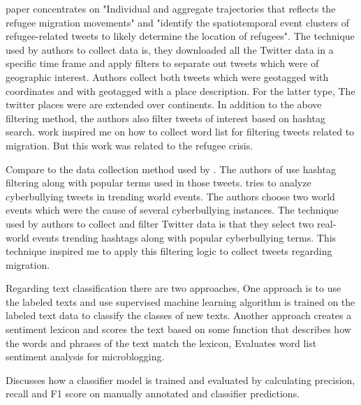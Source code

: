 \cite{Hübl} paper concentrates on "Individual and aggregate trajectories that reflects the refugee migration
movements" and "identify the spatiotemporal event clusters of refugee-related tweets to
likely determine the location of refugees". The technique used by authors to collect data is, they
downloaded all the Twitter data in a specific time frame and apply filters to separate out tweets
which were of geographic interest. Authors collect both tweets which were geotagged with coordinates
and with geotagged with a place description. For the latter type, The twitter places were
are extended over continents. In addition to the above filtering method, the authors also filter tweets
of interest based on hashtag search. \cite{Hübl} work inspired me on how to collect word list for filtering
tweets related to migration. But this work was related to the refugee crisis.
 
Compare to the data collection method used by \cite{Hübl}. The authors of \cite{Cortis} use hashtag filtering
along with popular terms used in those tweets. \cite{Cortis} tries to analyze cyberbullying tweets in trending
world events. The authors choose two world events which were the cause of several cyberbullying instances.
The technique used by authors to collect and filter Twitter data is that they select two real-world
events trending hashtags along with popular cyberbullying terms. This technique inspired me to
apply this filtering logic to collect tweets regarding migration.


Regarding text classification there are two approaches, One approach is to use the labeled texts and use supervised machine learning algorithm is trained on the labeled text data to classify the classes
of new texts. Another approach creates a sentiment lexicon and scores the text based on some function that describes how the words and phrases of the text match the lexicon, \cite{DBLP} Evaluates word list sentiment analysis for microblogging.

 \cite{Jamie} Discusses how a classifier model is trained
and evaluated by calculating precision, recall and F1 score on manually annotated and classifier
predictions.



